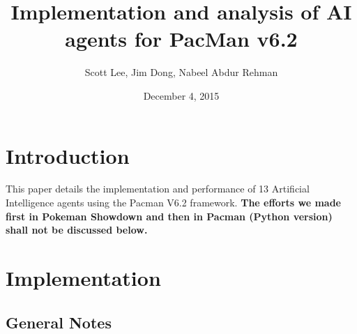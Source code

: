 \documentclass[a4paper]{article}
\title{Implementation and analysis of AI agents for PacMan v6.2}
\author{Scott Lee, Jim Dong, Nabeel Abdur Rehman}
\date{December 4, 2015}
\begin{document}
\maketitle

\section{Introduction}

This paper details the implementation and performance of 13 Artificial Intelligence agents using the Pacman V6.2 framework. \textbf{The efforts we made first in Pokeman Showdown and then in Pacman (Python version) shall not be discussed below.} 

\section{Implementation} 

\subsection{General Notes}
\end{document}
